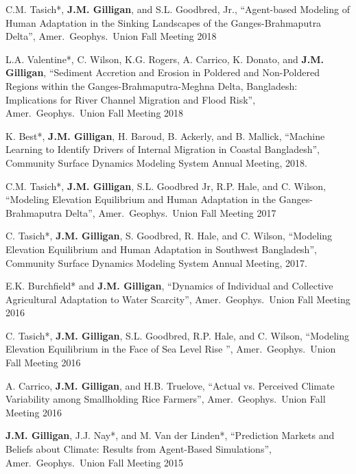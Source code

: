     \item
    C.M. Tasich*, \textbf{J.M. Gilligan}, and S.L. Goodbred, Jr.,
    \enquote{Agent-based Modeling of Human Adaptation in the Sinking Landscapes of the Ganges-Brahmaputra Delta},
    Amer.\ Geophys.\ Union Fall Meeting 2018

    \item
    L.A. Valentine*,  C. Wilson, K.G. Rogers, A. Carrico, K. Donato, and \textbf{J.M. Gilligan},
    \enquote{Sediment Accretion and Erosion in Poldered and Non-Poldered Regions within the
        Ganges-Brahmaputra-Meghna Delta, Bangladesh: Implications for River Channel Migration and Flood Risk},
    Amer.\ Geophys.\ Union Fall Meeting 2018

    \item
    K. Best*, \textbf{J.M. Gilligan}, H. Baroud, B. Ackerly, and B. Mallick,
    \enquote{Machine Learning to Identify Drivers of Internal Migration in Coastal Bangladesh},
    Community Surface Dynamics Modeling System Annual Meeting, 2018.

    \item
    C.M. Tasich*, \textbf{J.M. Gilligan}, S.L. Goodbred Jr, R.P. Hale, and C. Wilson,
    \enquote{Modeling Elevation Equilibrium and Human Adaptation in the Ganges-Brahmaputra Delta},
    Amer.\ Geophys.\ Union Fall Meeting 2017

    \item
    C. Tasich*, \textbf{J.M. Gilligan}, S. Goodbred, R. Hale, and C. Wilson,
    \enquote{Modeling Elevation Equilibrium and Human Adaptation in Southwest Bangladesh},
    Community Surface Dynamics Modeling System Annual Meeting, 2017.

    \item
    E.K. Burchfield* and \textbf{J.M. Gilligan},
    \enquote{Dynamics of Individual and Collective Agricultural Adaptation to Water Scarcity},
    Amer.\ Geophys.\ Union Fall Meeting 2016

    \item
    C. Tasich*, \textbf{J.M. Gilligan}, S.L. Goodbred, R.P. Hale, and C. Wilson,
    \enquote{Modeling Elevation Equilibrium in the Face of Sea Level Rise },
    Amer.\ Geophys.\ Union Fall Meeting 2016

    \item
    A. Carrico, \textbf{J.M. Gilligan}, and H.B. Truelove,
    \enquote{Actual vs. Perceived Climate Variability among Smallholding Rice Farmers},
    Amer.\ Geophys.\ Union Fall Meeting 2016

    \item \textbf{J.M. Gilligan}, J.J. Nay*, and M. Van der Linden*,
    \enquote{Prediction Markets and Beliefs about Climate: Results from Agent-Based Simulations},
    Amer.\ Geophys.\ Union Fall Meeting 2015

